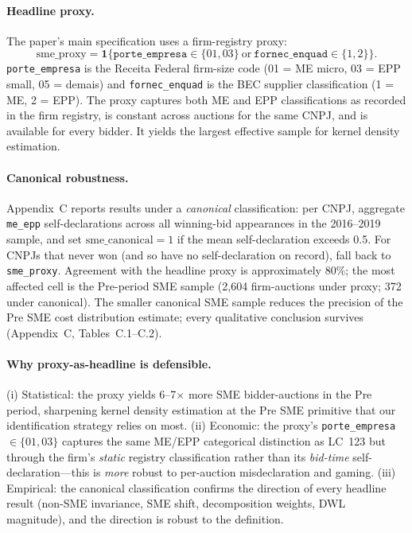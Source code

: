 \documentclass[12pt]{article}
\begin{document}
\paragraph{Headline proxy.}
The paper's main specification uses a firm-registry proxy:
\[
\text{sme\_proxy} = \mathbf{1}\{\texttt{porte\_empresa} \in \{01, 03\}
\ \text{or}\ \texttt{fornec\_enquad} \in \{1, 2\}\}.
\]
\texttt{porte\_empresa} is the Receita Federal firm-size code (01 = ME
micro, 03 = EPP small, 05 = demais) and \texttt{fornec\_enquad} is the BEC
supplier classification (1 = ME, 2 = EPP). The proxy captures both
ME and EPP classifications as recorded in the firm registry, is constant
across auctions for the same CNPJ, and is available for every bidder.
It yields the largest effective sample for kernel density estimation.

\paragraph{Canonical robustness.}
Appendix~C reports results under a \emph{canonical} classification:
per CNPJ, aggregate \texttt{me\_epp} self-declarations across all
winning-bid appearances in the 2016--2019 sample, and set
$\text{sme\_canonical} = 1$ if the mean self-declaration exceeds 0.5.
For CNPJs that never won (and so have no self-declaration on record),
fall back to \texttt{sme\_proxy}. Agreement with the headline proxy is
approximately 80\%; the most affected cell is the Pre-period SME sample
(2{,}604 firm-auctions under proxy; 372 under canonical). The smaller
canonical SME sample reduces the precision of the Pre SME cost
distribution estimate; every qualitative conclusion survives
(Appendix~C, Tables~C.1--C.2).

\paragraph{Why proxy-as-headline is defensible.}
(i) Statistical: the proxy yields 6--7$\times$ more SME bidder-auctions
in the Pre period, sharpening kernel density estimation at the Pre SME
primitive that our identification strategy relies on most. (ii) Economic:
the proxy's \texttt{porte\_empresa} $\in \{01, 03\}$ captures the same
ME/EPP categorical distinction as LC~123 but through the firm's
\emph{static} registry classification rather than its \emph{bid-time}
self-declaration---this is \emph{more} robust to per-auction
misdeclaration and gaming. (iii) Empirical: the canonical classification
confirms the direction of every headline result (non-SME invariance,
SME shift, decomposition weights, DWL magnitude), and the direction is
robust to the definition.
\end{document}

